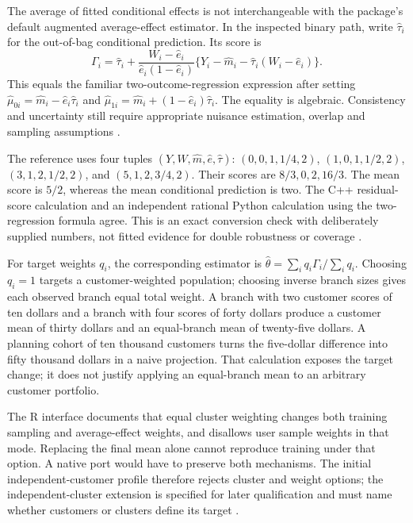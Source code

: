 The average of fitted conditional effects is not interchangeable with
the package's default augmented average-effect estimator. In the
inspected binary path, write \(\widehat\tau_i\) for the out-of-bag
conditional prediction. Its score is \[
 \Gamma_i=\widehat\tau_i+
 \frac{W_i-\widehat e_i}{\widehat e_i(1-\widehat e_i)}
 \{Y_i-\widehat m_i-\widehat\tau_i(W_i-\widehat e_i)\}.
\] This equals the familiar two-outcome-regression expression after
setting \(\widehat\mu_{0i}=\widehat m_i-\widehat e_i\widehat\tau_i\) and
\(\widehat\mu_{1i}=\widehat m_i+(1-\widehat e_i)\widehat\tau_i\). The
equality is algebraic. Consistency and uncertainty still require
appropriate nuisance estimation, overlap and sampling assumptions
\cite{exec13_grf_rpath}.

The reference uses four tuples
\((Y,W,\widehat m,\widehat e,\widehat\tau)\): \((0,0,1,1/4,2)\),
\((1,0,1,1/2,2)\), \((3,1,2,1/2,2)\), and \((5,1,2,3/4,2)\). Their
scores are \(8/3,0,2,16/3\). The mean score is \(5/2\), whereas the mean
conditional prediction is two. The C++ residual-score calculation and an
independent rational Python calculation using the two-regression formula
agree. This is an exact conversion check with deliberately supplied
numbers, not fitted evidence for double robustness or coverage
\cite{exec13_grf_oracle}.

For target weights \(q_i\), the corresponding estimator is
\(\widehat\theta=\sum_iq_i\Gamma_i/\sum_iq_i\). Choosing \(q_i=1\)
targets a customer-weighted population; choosing inverse branch sizes
gives each observed branch equal total weight. A branch with two
customer scores of ten dollars and a branch with four scores of forty
dollars produce a customer mean of thirty dollars and an equal-branch
mean of twenty-five dollars. A planning cohort of ten thousand customers
turns the five-dollar difference into fifty thousand dollars in a naive
projection. That calculation exposes the target change; it does not
justify applying an equal-branch mean to an arbitrary customer
portfolio.

The R interface documents that equal cluster weighting changes both
training sampling and average-effect weights, and disallows user sample
weights in that mode. Replacing the final mean alone cannot reproduce
training under that option. A native port would have to preserve both
mechanisms. The initial independent-customer profile therefore rejects
cluster and weight options; the independent-cluster extension is
specified for later qualification and must name whether customers or
clusters define its target \cite{exec13_grf_rpath}.

